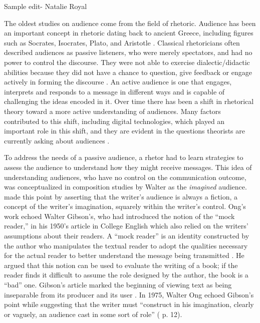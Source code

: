 Sample edit- Natalie Royal

The oldest studies on audience come from the field of rhetoric. Audience has been an important concept in rhetoric dating back to ancient Greece, including figures such as Socrates, Isocrates, Plato, and Aristotle \cite{breuch2018involving}. Classical rhetoricians often described audiences as passive listeners, who were merely spectators, and had no power to control the discourse. They were not able to exercise dialectic/didactic abilities because they did not have a chance to question, give feedback or engage actively in forming the discourse \cite{fish1980there}. An active audience is one that engages, interprets and responds to a message in different ways and is capable of challenging the ideas encoded in it. Over time there has been a shift in rhetorical theory toward a more active understanding of audiences. Many factors contributed to this shift, including digital technologies, which played an important role in this shift, and they are evident in the questions theorists are currently asking about audiences \cite{breuch2018involving}.

To address the needs of a passive audience, a rhetor had to learn strategies to assess the audience to understand how they might receive messages. This idea of understanding audiences, who have no control on the communication outcome, was conceptualized in composition studies by Walter \textcite{ong1975writer} as the \textit{imagined} audience. \textcite{ong1975writer} made this point by asserting that the writer’s audience is always a fiction, a concept of the writer’s imagination, squarely within the writer’s control. Ong’s work echoed Walter Gibson’s, who had introduced the notion of the “mock reader,” in his 1950’s article in College English \cite{gibson1950authors} which also relied on the writers’ assumptions about their readers. A “mock reader” is an identity constructed by the author who manipulates the textual reader to adopt the qualities necessary for the actual reader to better understand the message being transmitted \cite{gibson1950authors}. He argued that this notion can be used to evaluate the writing of a book; if the reader finds it difficult to assume the role designed by the author, the book is a “bad” one. Gibson’s article marked the beginning of viewing text as being inseparable from its producer and its user \cite{gibson1950authors}. In 1975, Walter Ong echoed Gibson’s point while suggesting that the writer must “construct in his imagination, clearly or vaguely, an audience cast in some sort of role” (\cite{ong1975writer} p. 12).

